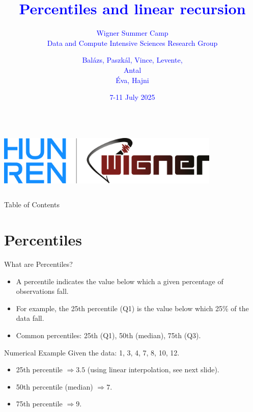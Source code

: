\documentclass{beamer}
\title{\textcolor{blue}{Percentiles and linear recursion}}
\subtitle{\textcolor{blue}{Wigner Summer Camp \\ Data and Compute Intensive Sciences Research Group}}
\author{\textcolor{blue}{Bal\'azs, Paszk\'al, Vince, Levente, \\ Antal \\ \'Eva, Hajni}}
\date{\textcolor{blue}{7-11 July 2025}}
\begin{document}
\begin{frame}
  \titlepage
  \begin{columns}
    \centering
    \includegraphics[width=0.8\textwidth]{img/logo.png}
  \end{columns}
\end{frame}

\begin{frame}{Table of Contents}
  \tableofcontents
\end{frame}

\section{Percentiles}
\begin{frame}{What are Percentiles?}
\begin{itemize}
  \item A percentile indicates the value below which a given percentage of observations fall.
  \item For example, the 25th percentile (Q1) is the value below which 25\% of the data fall.
  \item Common percentiles: 25th (Q1), 50th (median), 75th (Q3).
\end{itemize}
\end{frame}

\begin{frame}{Numerical Example}
Given the data: 1, 3, 4, 7, 8, 10, 12.
\begin{itemize}
  \item 25th percentile \( \Rightarrow 3.5 \) (using linear interpolation, see next slide).
  \item 50th percentile (median) \( \Rightarrow 7 \).
  \item 75th percentile \( \Rightarrow 9 \).
\end{itemize}
\end{frame}
\end{document}

